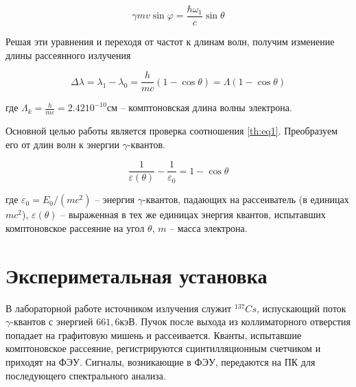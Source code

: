 \documentclass[12pt]{article}
\begin{document}
    $$
      \gamma m v \sin \varphi = \frac{\hbar \omega_1}{c} \sin \theta
    $$

    Решая эти уравнения и переходя от частот к длинам волн, получим изменение
    длины рассеянного излучения

    \begin{equation}
      \Delta \lambda = \lambda_1 - \lambda_0 = \frac{h}{mc} (1 - \cos \theta) =
      \Lambda (1 - \cos \theta)
      \label{th:eq1}
    \end{equation}

    где $\Lambda_k = \frac{h}{mc} = 2.4210^{-10} см$ -- комптоновская длина
    волны электрона.

    Основной целью работы является проверка соотношения \ref{th:eq1}.
    Преобразуем его от длин волн к энергии $\gamma$-квантов.

    \begin{equation}
      \frac{1}{\varepsilon(\theta)} - \frac{1}{\varepsilon_0} = 1 - \cos \theta
      \label{th:eq2}
    \end{equation}

    где $\varepsilon_0 = E_0 / (mc^2)$ -- энергия $\gamma$-квантов, падающих на
    рассеиватель (в единицах $mc^2$), $\varepsilon(\theta)$ -- выраженная в тех
    же единицах энергия квантов, испытавших комптоновское рассеяние на угол
    $\theta$, $m$ -- масса электрона.

  \section{Экспериметальная установка}

    В лабораторной работе источником излучения служит $^{137}Cs$, испускающий
    поток $\gamma$-квантов с энергией $661,6 кэВ$. Пучок после выхода из
    коллиматорного отверстия попадает на графитовую мишень и рассеивается.
    Кванты, испытавшие комптоновское рассеяние, регистрируются сцинтилляционным
    счетчиком и приходят на ФЭУ. Сигналы, возникающие в ФЭУ, передаются на ПК
    для последующего спектрального анализа.
\end{document}
